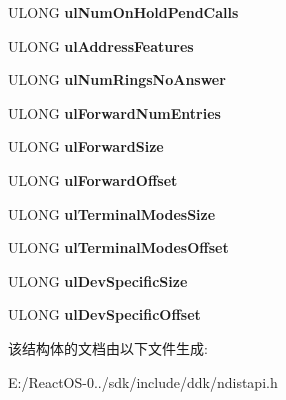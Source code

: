 \begin{DoxyCompactItemize}
U\+L\+O\+NG {\bfseries ul\+Num\+On\+Hold\+Pend\+Calls}
\item 
\mbox{\label{struct___l_i_n_e___a_d_d_r_e_s_s___s_t_a_t_u_s_a05fb61c209fb5ce08178ceada6cef6ed}} 
U\+L\+O\+NG {\bfseries ul\+Address\+Features}
\item 
\mbox{\label{struct___l_i_n_e___a_d_d_r_e_s_s___s_t_a_t_u_s_a145ab76d1dcaf4b73f78ec07a305b3dd}} 
U\+L\+O\+NG {\bfseries ul\+Num\+Rings\+No\+Answer}
\item 
\mbox{\label{struct___l_i_n_e___a_d_d_r_e_s_s___s_t_a_t_u_s_ab94d1489169f1b17e0a129d24fd9e52a}} 
U\+L\+O\+NG {\bfseries ul\+Forward\+Num\+Entries}
\item 
\mbox{\label{struct___l_i_n_e___a_d_d_r_e_s_s___s_t_a_t_u_s_ae7bb2d9f999163f9113dda52465f78c1}} 
U\+L\+O\+NG {\bfseries ul\+Forward\+Size}
\item 
\mbox{\label{struct___l_i_n_e___a_d_d_r_e_s_s___s_t_a_t_u_s_ab75130ae733ba2375923933d6260b898}} 
U\+L\+O\+NG {\bfseries ul\+Forward\+Offset}
\item 
\mbox{\label{struct___l_i_n_e___a_d_d_r_e_s_s___s_t_a_t_u_s_aa9a07aff5954378d5f561bac6ca4afc5}} 
U\+L\+O\+NG {\bfseries ul\+Terminal\+Modes\+Size}
\item 
\mbox{\label{struct___l_i_n_e___a_d_d_r_e_s_s___s_t_a_t_u_s_a8dfada83aefb66eb32af088cf08d1772}} 
U\+L\+O\+NG {\bfseries ul\+Terminal\+Modes\+Offset}
\item 
\mbox{\label{struct___l_i_n_e___a_d_d_r_e_s_s___s_t_a_t_u_s_ad0400b6af9ef2002e4efb002aef6c983}} 
U\+L\+O\+NG {\bfseries ul\+Dev\+Specific\+Size}
\item 
\mbox{\label{struct___l_i_n_e___a_d_d_r_e_s_s___s_t_a_t_u_s_a31dc8eddf3c8e6ab43a9a82ef86f7bb4}} 
U\+L\+O\+NG {\bfseries ul\+Dev\+Specific\+Offset}
\end{DoxyCompactItemize}


该结构体的文档由以下文件生成\+:\begin{DoxyCompactItemize}
\item 
E\+:/\+React\+O\+S-\/0../sdk/include/ddk/ndistapi.\+h\end{DoxyCompactItemize}

